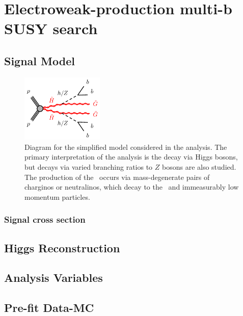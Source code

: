 \chapter{Electroweak-production multi-b SUSY search}
\label{chap:ewk_prod}


\section{Signal Model}

\begin{figure}[htbp]
	\centering
	\includegraphics[width=0.35\textwidth]{figures/ewk_prod/varie/N1N1-hhGG-bbbb_Z}
	\caption{Diagram for the simplified model considered in the analysis. The primary interpretation of the analysis is the decay via Higgs bosons, but decays via varied branching ratios to $Z$ bosons are also studied. The production of the \hino\ occurs
via mass-degenerate pairs of charginos or neutralinos, which decay to the \ninoone\ and immeasurably low momentum particles.} 
	\label{fig:feyn}
\end{figure}

\subsection{Signal cross section}


\section{Higgs Reconstruction}

\section{Analysis Variables}


\section{Pre-fit Data-MC}


